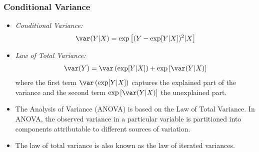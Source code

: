 

\begin{frame}
\frametitle{Conditional Variance}
\begin{itemize}
\item \emph{Conditional Variance:} 
\begin{align*}
\var(Y|X) = \exp\left[(Y-\exp[Y|X])^2 | X\right]
\end{align*}
\item \emph{Law of Total Variance:}
\begin{align*}
\var(Y) = \var\left(\exp[Y | X]\right) +  \exp\left[\var(Y|X)\right]
\end{align*}
where the first term $\var\left(\exp[Y|X]\right)$ captures the explained part of the variance and the second term $\exp\left[\var(Y|X)\right]$ the unexplained part.
\item The Analysis of Variance (ANOVA) is based on the Law of Total Variance. In ANOVA, the observed variance in a particular variable is partitioned into components attributable to different sources of variation.
\item The law of total variance is also known as the law of iterated variances.
\end{itemize}
\end{frame}

